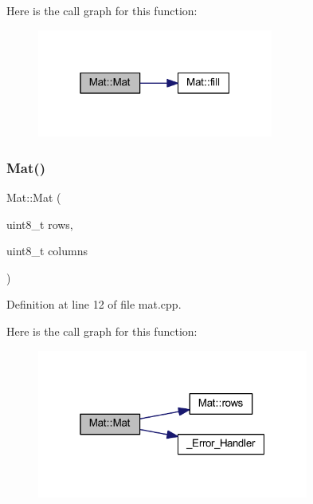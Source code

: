 Here is the call graph for this function\+:
\nopagebreak
\begin{figure}[H]
\begin{center}
\leavevmode
\includegraphics[width=220pt]{class_mat_af844a885aedf39d90ad27b2f34333791_cgraph}
\end{center}
\end{figure}
\mbox{\label{class_mat_a591f4755584ae81e04f14e8f780a05f8}} 
\subsubsection{\texorpdfstring{Mat()}{Mat()}\hspace{0.1cm}{\footnotesize\ttfamily [3/5]}}
{\footnotesize\ttfamily Mat\+::\+Mat (\begin{DoxyParamCaption}\item[{uint8\+\_\+t}]{rows,  }\item[{uint8\+\_\+t}]{columns }\end{DoxyParamCaption})}



Definition at line 12 of file mat.\+cpp.

Here is the call graph for this function\+:
\nopagebreak
\begin{figure}[H]
\begin{center}
\leavevmode
\includegraphics[width=253pt]{class_mat_a591f4755584ae81e04f14e8f780a05f8_cgraph}
\end{center}
\end{figure}
\mbox{\label{class_mat_a560a2b152f0b4c7389058c23668da819}} 
